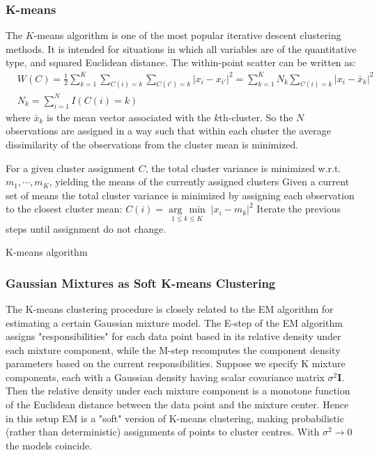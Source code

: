 \documentclass[12pt, letterpaper]{article}
\theoremstyle{definition}
\newcommand{\I}{\mathrm{\mathbf{I}}}
\newcommand{\argmin}[1]{\underset{#1}{\operatorname{arg}\,\operatorname{min}}\;}
\begin{document}
\subsubsection{K-means}
The $K$-means algorithm is one of the most popular iterative descent clustering methods. It is intended for situations in which all variables are of the quantitative type, and squared Euclidean distance.
The within-point scatter can be written as:
\begin{equation}
\begin{aligned}
&W(C) = \frac{1}{2}\sum_{k=1}^K \sum_{C(i) = k} \sum_{C(i') = k} |x_i - x_{i'}|^2= \sum_{k=1}^K N_k \sum_{C(i) = k}  |x_i - \bar{x}_{k}|^2\\
& N_k = \sum_{i=1}^N I(C(i) = k)
\end{aligned}
\end{equation}
where $\bar{x}_k$ is the mean vector associated with the $k$th-cluster. So the $N$ observations are assigned in a way such that within each cluster the average dissimilarity of the observations from the cluster mean is minimized.
\begin{algorithm}
For a given cluster assignment $C$, the total cluster variance is minimized w.r.t. $m_1, \cdots, m_K$, yielding the means of the currently assigned clusters\;
Given a current set of means the total cluster variance is minimized by assigning each observation to the closest cluster mean: $C(i) = \argmin{1\le k\le K}{|x_i-m_k|^2}$\;
Iterate the previous steps until assignment do not change.
\caption{K-means algorithm}
\end{algorithm}

\subsubsection{Gaussian Mixtures as Soft K-means Clustering}
The K-means clustering procedure is closely related to the EM algorithm for estimating a certain Gaussian mixture model. The E-step of the EM algorithm assigns "responsibilities" for each data point based in its relative density under each mixture component, while the M-step recomputes the component density parameters based on the current responsibilities. Suppose we specify K mixture components, each with a Gaussian density having scalar covariance matrix $\sigma^2\I$. Then the relative density under each mixture component is a monotone function of the Euclidean distance between the data point and the mixture center. Hence in this setup EM is a "soft" version of K-means clustering, making probabilistic (rather than deterministic) assignments of points to cluster centres. With $\sigma^2 \rightarrow 0$  the models coincide.
\end{document}
